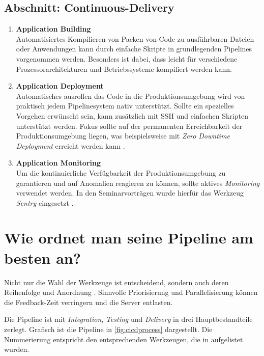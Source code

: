 \subsection{Abschnitt: Continuous-Delivery}
\begin{enumerate}[resume]
    \itemsep-0.5em 
    \item \textbf{Application Building}\label{Application Building} \\
        Automatisiertes Kompilieren von Packen von Code zu ausführbaren Dateien oder Anwendungen kann durch einfache Skripte in grundlegenden Pipelines vorgenommen werden. Besonders ist dabei, dass leicht für verschiedene Prozessorarchitekturen und Betriebssysteme kompiliert werden kann.
    \item \textbf{Application Deployment}\label{Application Deployment} \\
        Automatisches ausrollen das Code in die Produktionsumgebung wird von praktisch jedem Pipelinesystem nativ unterstützt. Sollte ein spezielles Vorgehen erwünscht sein, kann zusätzlich mit SSH und einfachen Skripten unterstützt werden. Fokus sollte auf der permanenten Erreichbarkeit der Produktionsumgebung liegen, was beispielsweise mit \emph{Zero Downtime Deployment} erreicht werden kann \cite{craftquestWhatAreZero}. 
    \item \textbf{Application Monitoring}\label{Application Monitoring} \\
        Um die kontinuierliche Verfügbarkeit der Produktionsumgebung zu garantieren und auf Anomalien reagieren zu können, sollte aktives \emph{Monitoring} verwendet werden. In den Seminarvorträgen wurde hierfür das Werkzeug \emph{Sentry} eingesetzt \cite{sentryApplicationMonitoringError}.
\end{enumerate}

\section{Wie ordnet man seine Pipeline am besten an?}

Nicht nur die Wahl der Werkzeuge ist entscheidend, sondern auch deren Reihenfolge und Anordnung \cite{nemytchenkoGitLabCIRun2016}. 
Sinnvolle Priorisierung und Parallelisierung können die Feedback-Zeit verringern und die Server entlasten. 

Die Pipeline ist mit \emph{Integration}, \emph{Testing} und \emph{Delivery} in drei Hauptbestandteile zerlegt. Grafisch ist die Pipeline in \autoref{fig:cicdprocess} dargestellt. Die Nummerierung entspricht den entsprechenden Werkzeugen, die in  aufgelistet wurden.

